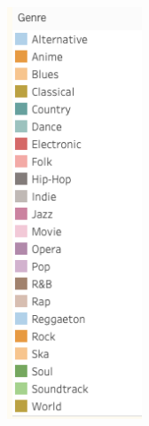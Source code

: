 \documentclass[
]{article}
\begin{document}
\begin{center}\includegraphics[width=0.7\linewidth]{Screen Shot 2020-11-23 at 11.34.46 PM} \end{center}
\end{document}
